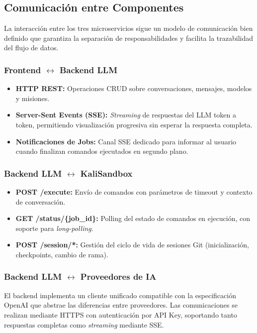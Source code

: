 \subsection{Comunicación entre Componentes}

La interacción entre los tres microservicios sigue un modelo de comunicación bien definido que garantiza la separación de responsabilidades y facilita la trazabilidad del flujo de datos.

\subsubsection{Frontend $\leftrightarrow$ Backend LLM}

\begin{itemize}
    \item \textbf{HTTP REST:} Operaciones CRUD sobre conversaciones, mensajes, modelos y misiones.
    \item \textbf{Server-Sent Events (SSE):} \textit{Streaming} de respuestas del LLM token a token, permitiendo visualización progresiva sin esperar la respuesta completa.
    \item \textbf{Notificaciones de Jobs:} Canal SSE dedicado para informar al usuario cuando finalizan comandos ejecutados en segundo plano.
\end{itemize}

\subsubsection{Backend LLM $\leftrightarrow$ KaliSandbox}

\begin{itemize}
    \item \textbf{POST /execute:} Envío de comandos con parámetros de timeout y contexto de conversación.
    \item \textbf{GET /status/\{job\_id\}:} Polling del estado de comandos en ejecución, con soporte para \textit{long-polling}.
    \item \textbf{POST /session/*:} Gestión del ciclo de vida de sesiones Git (inicialización, checkpoints, cambio de rama).
\end{itemize}

\subsubsection{Backend LLM $\leftrightarrow$ Proveedores de IA}

El backend implementa un cliente unificado compatible con la especificación OpenAI que abstrae las diferencias entre proveedores. Las comunicaciones se realizan mediante HTTPS con autenticación por API Key, soportando tanto respuestas completas como \textit{streaming} mediante SSE.



